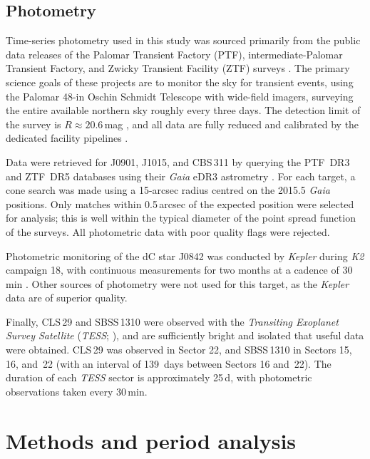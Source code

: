 \documentclass[fleqn,usenatbib,useAMS]{mnras}
\begin{document}
\subsection{Photometry}

Time-series photometry used in this study was sourced primarily from the public data releases of the Palomar Transient Factory (PTF), intermediate-Palomar Transient Factory, and Zwicky Transient Facility (ZTF) surveys \citep{Law2009,Kulkarni2013,Bellm2014}.  The primary science goals of these projects are to monitor the sky for transient events, using the Palomar 48-in Oschin Schmidt Telescope with wide-field imagers, surveying the entire available northern sky roughly every three days.  The detection limit of the survey is $R \approx 20.6\,$mag \citep{Rau2009}, and all data are fully reduced and calibrated by the dedicated facility pipelines \citep{Ofek2012,Masci2019}.

Data were retrieved for J0901, J1015, and CBS\,311 by querying the PTF~DR3 and ZTF~DR5 databases using their \textit{Gaia} eDR3 astrometry \citep{eDR3}.  For each target, a cone search was made using a 15-arcsec radius centred on the 2015.5 \textit{Gaia} positions.  Only matches within 0.5\,arcsec of the expected position were selected for analysis; this is well within the typical diameter of the point spread function of the surveys.  All photometric data with poor quality flags were rejected.

Photometric monitoring of the dC star J0842 was conducted by \textit{Kepler} during \textit{K2} campaign 18, with continuous measurements for two months at a cadence of 30\,min \citep{Howell14}.  Other sources of photometry were not used for this target, as the \textit{Kepler} data are of superior quality.

Finally, CLS\,29 and SBSS\,1310 were observed with the {\em Transiting Exoplanet Survey Satellite} ({\em TESS}; \citealt{TESS}), and are sufficiently bright and isolated that useful data were obtained.  CLS\,29 was observed in Sector 22, and SBSS\,1310 in Sectors 15, 16, and~22 (with an interval of 139~days between Sectors 16 and~22).  The duration of each {\em TESS} sector is approximately 25\,d, with photometric observations taken every 30\,min.

\section{Methods and period analysis}
\end{document}
